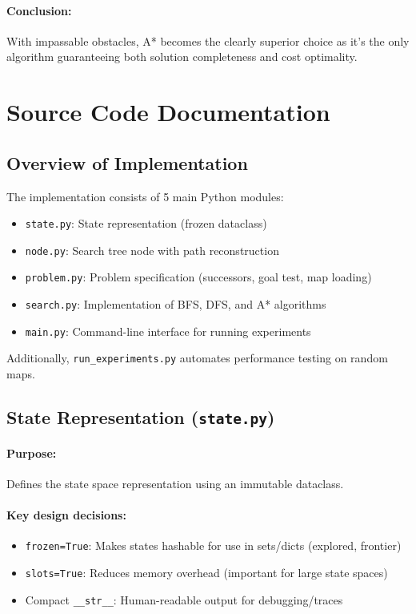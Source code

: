 \documentclass[11pt,a4paper]{article}
\begin{document}
\paragraph{Conclusion:}
With impassable obstacles, A* becomes the clearly superior choice as it's the only algorithm guaranteeing both solution completeness and cost optimality.

\newpage
\appendix
\section{Source Code Documentation}

\subsection{Overview of Implementation}
The implementation consists of 5 main Python modules:
\begin{itemize}[leftmargin=1.5cm,itemsep=0.1em]
    \item \texttt{state.py}: State representation (frozen dataclass)
    \item \texttt{node.py}: Search tree node with path reconstruction
    \item \texttt{problem.py}: Problem specification (successors, goal test, map loading)
    \item \texttt{search.py}: Implementation of BFS, DFS, and A* algorithms
    \item \texttt{main.py}: Command-line interface for running experiments
\end{itemize}

\noindent Additionally, \texttt{run\_experiments.py} automates performance testing on random maps.

\subsection{State Representation (\texttt{state.py})}
\paragraph{Purpose:} Defines the state space representation using an immutable dataclass.

\paragraph{Key design decisions:}
\begin{itemize}[leftmargin=1.5cm,itemsep=0.1em]
    \item \texttt{frozen=True}: Makes states hashable for use in sets/dicts (explored, frontier)
    \item \texttt{slots=True}: Reduces memory overhead (important for large state spaces)
    \item Compact \texttt{\_\_str\_\_}: Human-readable output for debugging/traces
\end{itemize}
\end{document}
